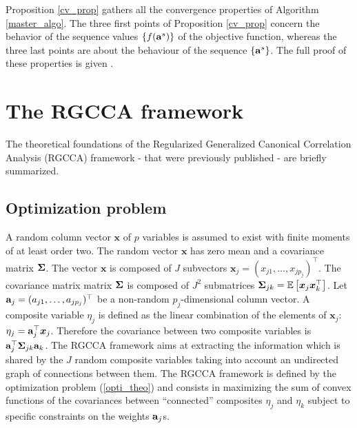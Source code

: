 \documentclass[
]{jss}
\begin{document}
Proposition \ref{cv_prop} gathers all the convergence properties of
Algorithm \ref{master_algo}. The three first points of Proposition
\ref{cv_prop} concern the behavior of the sequence values
\(\left\lbrace f(\mathbf{a}^s) \right\rbrace\) of the objective function,
whereas the three last points are about the behaviour of the sequence
\(\left\lbrace \mathbf{a}^s \right\rbrace\). The full proof of these
properties is given \citet{Tenenhaus2017}.

\hypertarget{the-rgcca-framework}{%
\section{The RGCCA framework}\label{the-rgcca-framework}}

The theoretical foundations of the Regularized Generalized Canonical
Correlation Analysis (RGCCA) framework - that were previously published
\citetext{\citealp[ ]{Tenenhaus2011}; \citealp[
]{Tenenhaus2014}; \citealp[ ]{Tenenhaus2015}; \citealp{Tenenhaus2017}} -
are briefly summarized.

\hypertarget{optimization-problem}{%
\subsection{Optimization problem}\label{optimization-problem}}

A random column vector \(\boldsymbol x\) of \(p\) variables is assumed
to exist with finite moments of at least order two. The random vector
\(\boldsymbol x\) has zero mean and a covariance matrix \(\mathbf{\Sigma}\).
The vector \(\boldsymbol x\) is composed of \(J\) subvectors
\(\boldsymbol x_j = (x_{j1}, \ldots, x_{jp_j})^\top\). The covariance
matrix matrix \(\mathbf{\Sigma}\) is composed of \(J^2\) submatrices
\(\mathbf{\Sigma}_{jk} = \mathbb{E}\left[\boldsymbol x_j \boldsymbol x_k^\top\right]\).
Let \(\mathbf{a}_j = (a_{j1}, \ldots, a_{jp_j})^\top\) be a non-random
\(p_j\)-dimensional column vector. A composite variable \(\eta_j\) is
defined as the linear combination of the elements of
\(\boldsymbol x_j\): \(\eta_j = \mathbf{a}_j^\top \boldsymbol x_j\).
Therefore the covariance between two composite variables is
\(\mathbf{a}_j^\top \mathbf{\Sigma}_{jk} \mathbf{a}_k\). The RGCCA framework
aims at extracting the information which is shared by the \(J\) random
composite variables taking into account an undirected graph of
connections between them. The RGCCA framework is defined by the
optimization problem (\ref{opti_theo}) and consists in maximizing the
sum of convex functions of the covariances between ``connected''
composites \(\eta_j\) and \(\eta_k\) subject to specific constraints on
the weights \(\mathbf{a}_j\)s.
\end{document}
